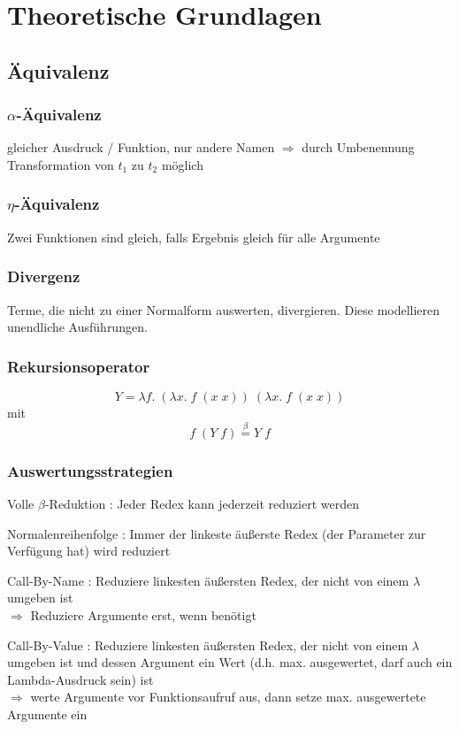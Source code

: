 \chapter{Theoretische Grundlagen}
\section{Äquivalenz}
\subsection{$\alpha$-Äquivalenz }
gleicher Ausdruck / Funktion, nur andere Namen $\Rightarrow$ durch Umbenennung Transformation von $t_1$ zu $t_2$ möglich

\subsection{$\eta$-Äquivalenz }
Zwei Funktionen sind gleich, falls Ergebnis gleich für alle Argumente

\subsection{Divergenz }
Terme, die nicht zu einer Normalform auswerten, divergieren. Diese modellieren unendliche Ausführungen.

\subsection{Rekursionsoperator }
$$Y= \lambda f.\; (\lambda x.\; f\; (x\; x))\; (\lambda x.\; f\; (x\; x))$$
mit 
$$f\; (Y\; f) \overset{\beta}{=} Y\; f$$ 

\subsection{Auswertungsstrategien}
\begin{compactitem}
	\item Volle $\beta$-Reduktion : Jeder Redex kann jederzeit reduziert werden
	\item Normalenreihenfolge : Immer der linkeste äußerste Redex (der Parameter zur Verfügung hat) wird reduziert
	\item Call-By-Name : Reduziere linkesten äußersten Redex, der nicht von einem $\lambda$ umgeben ist\\
	$\Rightarrow$ Reduziere Argumente erst, wenn benötigt
	\item Call-By-Value : Reduziere linkesten äußersten Redex, der nicht von einem $\lambda$ umgeben ist und dessen Argument ein Wert (d.h. max. ausgewertet, darf auch ein Lambda-Ausdruck sein) ist\\
	$\Rightarrow$ werte Argumente vor Funktionsaufruf aus, dann setze max. ausgewertete Argumente ein
\end{compactitem}

